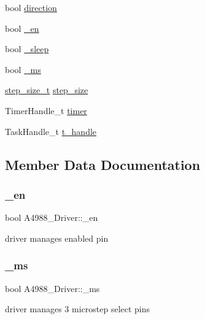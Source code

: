 \begin{DoxyCompactItemize}
\item 
bool \hyperlink{structA4988__Driver_ae791dc2c2dd7f1d4aa89e1331d0314d0}{direction}
\item 
bool \hyperlink{structA4988__Driver_a709ae8d646b266f10898b7956d029eda}{\+\_\+en}
\item 
bool \hyperlink{structA4988__Driver_aa2e797a748776c84f6ccbabec8dc5c62}{\+\_\+sleep}
\item 
bool \hyperlink{structA4988__Driver_a12a7ffdf8339777f62983bee557d047c}{\+\_\+ms}
\item 
\hyperlink{group__A4988__definitions_gad84fc402211d9487e63ee884e4d79531}{step\+\_\+size\+\_\+t} \hyperlink{structA4988__Driver_a467d41c46428c89d97e592584fd869cc}{step\+\_\+size}
\item 
Timer\+Handle\+\_\+t \hyperlink{structA4988__Driver_a8775438d7522345042f8756d1c158567}{timer}
\item 
Task\+Handle\+\_\+t \hyperlink{structA4988__Driver_a74e0833714f5b0b7d08c1dd00d8027e0}{t\+\_\+handle}
\end{DoxyCompactItemize}


\subsection{Member Data Documentation}
\mbox{\label{structA4988__Driver_a709ae8d646b266f10898b7956d029eda}} 
\subsubsection{\texorpdfstring{\+\_\+en}{\_en}}
{\footnotesize\ttfamily bool A4988\+\_\+\+Driver\+::\+\_\+en}

driver manages enabled pin \mbox{\label{structA4988__Driver_a12a7ffdf8339777f62983bee557d047c}} 
\subsubsection{\texorpdfstring{\+\_\+ms}{\_ms}}
{\footnotesize\ttfamily bool A4988\+\_\+\+Driver\+::\+\_\+ms}

driver manages 3 microstep select pins \mbox{\label{structA4988__Driver_aa2e797a748776c84f6ccbabec8dc5c62}} 
